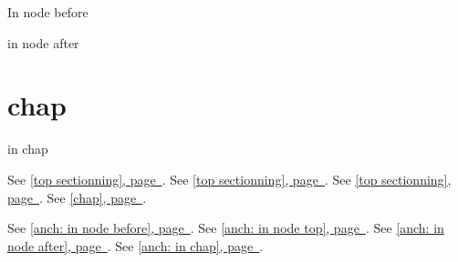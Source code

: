 \documentclass{book}
\begin{document}
\label{anchor:node-before}%

In node before
\label{anchor:anch_003a-in-node-before}%

\label{anchor:Top}%
\label{anchor:anch_003a-in-node-top}%
\label{anchor:after}%

in node after
\label{anchor:anch_003a-in-node-after}%

\chapter{{chap}}
\label{anchor:chap}%

in chap
\label{anchor:anch_003a-in-chap}%

See \hyperref[anchor:anch_003a-in-node-before]{[top sectionning], page~\pageref*{anchor:anch_003a-in-node-before}}.
See \hyperref[anchor:anch_003a-in-node-top]{[top sectionning], page~\pageref*{anchor:anch_003a-in-node-top}}.
See \hyperref[anchor:anch_003a-in-node-after]{[top sectionning], page~\pageref*{anchor:anch_003a-in-node-after}}.
See \hyperref[anchor:anch_003a-in-chap]{[chap], page~\pageref*{anchor:anch_003a-in-chap}}.

See \hyperref[anchor:anch_003a-in-node-before]{[anch: in node before], page~\pageref*{anchor:anch_003a-in-node-before}}.
See \hyperref[anchor:anch_003a-in-node-top]{[anch: in node top], page~\pageref*{anchor:anch_003a-in-node-top}}.
See \hyperref[anchor:anch_003a-in-node-after]{[anch: in node after], page~\pageref*{anchor:anch_003a-in-node-after}}.
See \hyperref[anchor:anch_003a-in-chap]{[anch: in chap], page~\pageref*{anchor:anch_003a-in-chap}}.
\end{document}
